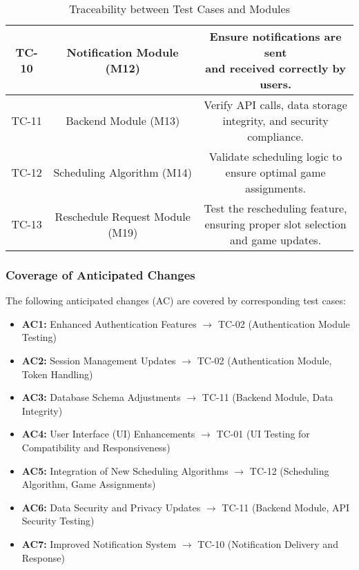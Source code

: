 \documentclass[12pt, titlepage]{article}
\begin{document}
\begin{table}
\begin{tabular}{ |c|c|c| }
        TC-10 & Notification Module (M12) & \makecell{Ensure notifications are sent\\ and received correctly by users.} \\ \hline
		TC-11 & Backend Module (M13) & \makecell{Verify API calls, data storage\\ integrity, and security compliance.} \\ \hline
		TC-12 & Scheduling Algorithm (M14) & \makecell{Validate scheduling logic to\\ ensure optimal game assignments.} \\ \hline
		TC-13 & Reschedule Request Module (M19) & \makecell{Test the rescheduling feature,\\ ensuring proper slot selection\\ and game updates.} \\ \hline
    \end{tabular}
	\caption{Traceability between Test Cases and Modules}
\end{table}

\subsubsection*{Coverage of Anticipated Changes}

The following anticipated changes (AC) are covered by corresponding test cases:

\begin{itemize}
    \item \textbf{AC1:} Enhanced Authentication Features $\rightarrow$ TC-02 (Authentication Module Testing)
    \item \textbf{AC2:} Session Management Updates $\rightarrow$ TC-02 (Authentication Module, Token Handling)
    \item \textbf{AC3:} Database Schema Adjustments $\rightarrow$ TC-11 (Backend Module, Data Integrity)
    \item \textbf{AC4:} User Interface (UI) Enhancements $\rightarrow$ TC-01 (UI Testing for Compatibility and Responsiveness)
    \item \textbf{AC5:} Integration of New Scheduling Algorithms $\rightarrow$ TC-12 (Scheduling Algorithm, Game Assignments)
    \item \textbf{AC6:} Data Security and Privacy Updates $\rightarrow$ TC-11 (Backend Module, API Security Testing)
    \item \textbf{AC7:} Improved Notification System $\rightarrow$ TC-10 (Notification Delivery and Response)
\end{itemize}
\end{document}
